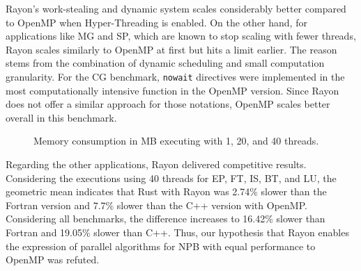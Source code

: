     Rayon's work-stealing and dynamic system scales considerably better compared to OpenMP when Hyper-Threading is enabled. On the other hand, for applications like MG and SP, which are known to stop scaling with fewer threads, Rayon scales similarly to OpenMP at first but hits a limit earlier. The reason stems from the combination of dynamic scheduling and small computation granularity. For the CG benchmark, \texttt{nowait} directives were implemented in the most computationally intensive function in the OpenMP version. Since Rayon does not offer a similar approach for those notations, OpenMP scales better overall in this benchmark. 

    \begin{figure*}[!ht]
         \centering
         \vspace{-0.1cm}
         \caption{Memory consumption in MB executing with 1, 20, and 40 threads.}
         \label{fig:mem}
         \vspace{-0.0cm}
        \end{figure*}
    
    Regarding the other applications, Rayon delivered competitive results. Considering the executions using 40 threads for EP, FT, IS, BT, and LU, the geometric mean indicates that Rust with Rayon was 2.74\% slower than the Fortran version and 7.7\% slower than the C++ version with OpenMP. Considering all benchmarks, the difference increases to 16.42\% slower than Fortran and 19.05\% slower than C++. Thus, our hypothesis that Rayon enables the expression of parallel algorithms for NPB with equal performance to OpenMP was refuted.





